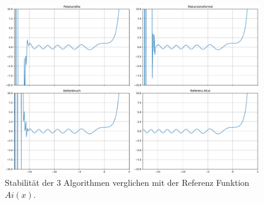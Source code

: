 \begin{figure}
    \centering
    \includegraphics[width=1\textwidth]{papers/0f1/images/stabilitaet.pdf}
    \caption{Stabilität der 3 Algorithmen verglichen mit der Referenz Funktion $Ai(x)$.
    \label{0f1:ausblick:plot:airy:stabilitaet}}
\end{figure}

